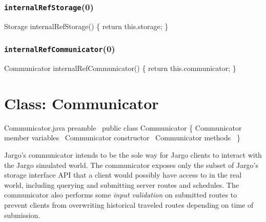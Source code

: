 \subsection{\texttt{internalRefStorage}(0)}
\nwenddocs{}\endmoddef{}
Storage internalRefStorage() \{
  return this.storage;
\}
\eatline
{}\nwendcode{}\nwdocspar
\subsection{\texttt{internalRefCommunicator}(0)}
\nwenddocs{}\endmoddef{}
Communicator internalRefCommunicator() \{
  return this.communicator;
\}
\eatline
{}\nwendcode{}\chapter{Class: Communicator}
\label{communicator}

\nwenddocs{}\endmoddef{}
\LA{}Communicator.java preamble~{\nwtagstyle{}}\RA{}
public class Communicator \{
  \LA{}\code{}Communicator\edoc{} member variables~{\nwtagstyle{}}\RA{}
  \LA{}\code{}Communicator\edoc{} constructor~{\nwtagstyle{}}\RA{}
  \LA{}\code{}Communicator\edoc{} methods~{\nwtagstyle{}}\RA{}
\}
\nwendcode{}\nwdocspar

Jargo's communicator intends to be the sole way for Jargo clients to interact
with the Jargo simulated world. The communicator exposes only the subset of
Jargo's storage interface API that a client would possibly have access to in
the real world, including querying and submitting server routes and schedules.
The communicator also performs some \emph{input validation} on submitted routes
to prevent clients from overwriting historical traveled routes depending on
time of submission.

